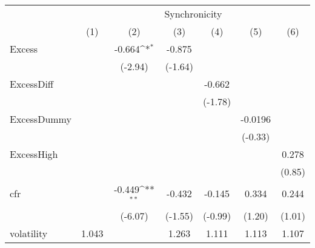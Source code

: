 {
\def\sym#1{\ifmmode^{#1}\else\(^{#1}\)\fi}
\begin{tabular}{l*{6}{c}}
\hline\hline
            &\multicolumn{6}{c}{Synchronicity}                                                                                                  \\\cmidrule(lr){2-7}
            &\multicolumn{1}{c}{(1)}         &\multicolumn{1}{c}{(2)}         &\multicolumn{1}{c}{(3)}         &\multicolumn{1}{c}{(4)}         &\multicolumn{1}{c}{(5)}         &\multicolumn{1}{c}{(6)}         \\
\hline
Excess      &                     &      -0.664\sym{*}  &      -0.875         &                     &                     &                     \\
            &                     &     (-2.94)         &     (-1.64)         &                     &                     &                     \\
[1em]
ExcessDiff  &                     &                     &                     &      -0.662         &                     &                     \\
            &                     &                     &                     &     (-1.78)         &                     &                     \\
[1em]
ExcessDummy &                     &                     &                     &                     &     -0.0196         &                     \\
            &                     &                     &                     &                     &     (-0.33)         &                     \\
[1em]
ExcessHigh  &                     &                     &                     &                     &                     &       0.278         \\
            &                     &                     &                     &                     &                     &      (0.85)         \\
[1em]
cfr         &                     &      -0.449\sym{**} &      -0.432         &      -0.145         &       0.334         &       0.244         \\
            &                     &     (-6.07)         &     (-1.55)         &     (-0.99)         &      (1.20)         &      (1.01)         \\
[1em]
volatility  &       1.043         &                     &       1.263         &       1.111         &       1.113         &       1.107         \\

\end{tabular}}

